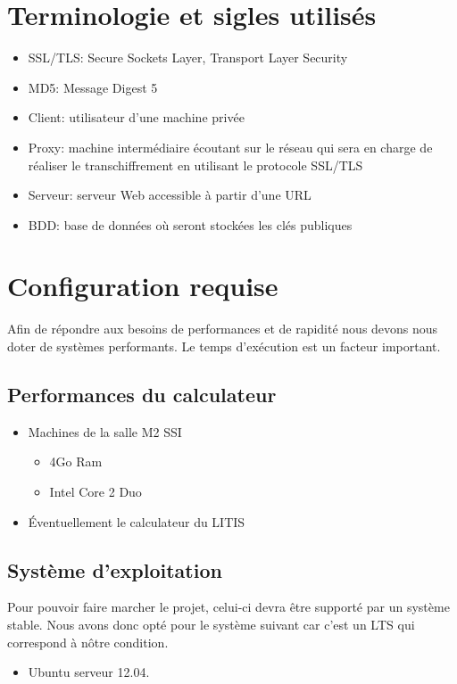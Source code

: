 \documentclass[a4paper,11pt,french]{article}
\begin{document}
\section{Terminologie et sigles utilisés}

\begin{itemize}
\item SSL/TLS: Secure Sockets Layer, Transport Layer Security 
\item MD5: Message Digest 5
\item Client: utilisateur d'une machine privée
\item Proxy: machine intermédiaire écoutant sur le réseau qui sera en charge de réaliser le transchiffrement en utilisant le protocole SSL/TLS
\item Serveur: serveur Web accessible à partir d'une URL
\item BDD: base de données où seront stockées les clés publiques
\end{itemize}


\section{Configuration requise}
Afin de répondre aux besoins de performances et de rapidité nous devons nous doter de systèmes performants. Le temps d'exécution est un facteur important.



\subsection{Performances du calculateur}
\begin{itemize}
\item Machines de la salle M2 SSI
\begin{itemize}
\item 4Go Ram
\item Intel Core 2 Duo
\end{itemize}
\item \'Eventuellement le calculateur du LITIS
\end{itemize}



\subsection{Système d'exploitation}
Pour pouvoir faire marcher le projet, celui-ci devra être supporté par un système stable. Nous avons donc opté pour le système suivant car c'est un LTS qui correspond à nôtre condition.
\begin{itemize}
\item Ubuntu serveur 12.04. 
\end{itemize}
\end{document}
